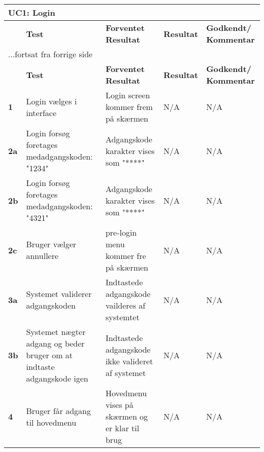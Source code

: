 
\begin{center}
\begin{longtable}{|p{}|p{}|p{}|p{}|p{}|} %
\hline
\multicolumn{5}{|l|}{\textbf{UC1: Login}} \\ \hline
\multicolumn{1}{|c|}{} &
\textbf{Test} &
\textbf{Forventet \newline Resultat} &
\textbf{Resultat} &
\textbf{Godkendt/ \newline Kommentar} \\ \hline 
\endfirsthead

\multicolumn{5}{l}{...fortsat fra forrige side} \\ \hline 
\multicolumn{1}{|c|}{} &
\textbf{Test} &
\textbf{Forventet \newline Resultat} &
\textbf{Resultat} &
\textbf{Godkendt/ \newline Kommentar} \\ \hline 
\endhead


\textbf{1}		
&Login vælges i interface	
&Login screen kommer frem på skærmen 	
&N/A 	
&N/A \\\hline
\textbf{2a}		
&Login forsøg foretages medadgangskoden: "1234"	
&Adgangskode karakter vises som "****" 	
&N/A 	
&N/A \\\hline
\textbf{2b}		
&Login forsøg foretages medadgangskoden: "4321"	
&Adgangskode karakter vises som "****" 	
&N/A 	
&N/A \\\hline
\textbf{2c}		
&Bruger vælger annullere	
&pre-login menu kommer fre på skærmen 	
&N/A 	
&N/A \\\hline

\textbf{3a}		
&Systemet validerer adgangskoden		
&Indtastede adgangskode vailderes af systemtet 	
&N/A 	
&N/A \\\hline
\textbf{3b}		
&Systemet nægter adgang og beder bruger om at indtaste adgangskode igen	
&Indtastede adgangskode ikke valideret af systemet	
&N/A 	
&N/A \\\hline
\textbf{4}		
&Bruger får adgang til hovedmenu		
&Hovedmenu vises på skærmen og er klar til brug 	
&N/A 	
&N/A  \\\hline
	\end{longtable}
	\label{ATUC1} 
\end{center}